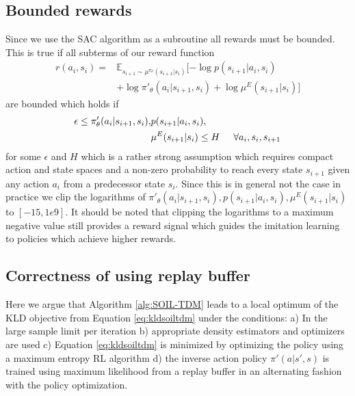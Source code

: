 \documentclass{article}
\begin{document}
\subsection{Bounded rewards}\label{appendix:assumptions}
Since we use the SAC algorithm as a subroutine all rewards must be bounded.
This is true if all subterms of our reward function
\begin{equation}
\begin{aligned}
r(a_i, s_i) = & \mathbb{E}_{s_{i+1} \sim \mu^{\pi_{\theta}}(s_{i+1}|s_i)} [-\log p(s_{i+1}|a_i,s_i) \\& + \log \pi'_{\theta}(a_{i}|s_{i+1},s_i) + \log  \mu^{E}(s_{i+1}|s_i)]
\end{aligned}
\end{equation}
are bounded which holds if 
\begin{equation}
\begin{aligned}\epsilon \leq \pi'_{\theta}(a_{i}|s_{i+1},s_i), & p(s_{i+1}|a_i,s_i), \\& \mu^{E}(s_{i+1}|s_i) \leq H \hspace{0.5cm} \forall a_i,s_i,s_{i+1}
\end{aligned}
\end{equation}
for some $\epsilon$ and $H$ which is a rather strong assumption which requires compact action and state spaces and a non-zero probability to reach every state $s_{i+1}$ given any action $a_i$ from a predecessor state $s_i$.
Since this is in general not the case in practice we clip the logarithms of $\pi'_{\theta}(a_{i}|s_{i+1},s_i), p(s_{i+1}|a_i,s_i), \mu^{E}(s_{i+1}|s_i)$ to $[-15,1e9]$. It should be noted that clipping the logarithms to a maximum negative value still provides a reward signal which guides the imitation learning to policies which achieve higher rewards.

\subsection{Correctness of using replay buffer}\label{appendix:replaybuffer}
Here  we  argue that Algorithm \ref{alg:SOIL-TDM} leads to a local optimum of the KLD objective from Equation \ref{eq:kldsoiltdm} under the conditions: a) In the large sample limit per iteration b) appropriate density estimators and optimizers are used c) Equation \ref{eq:kldsoiltdm} is minimized by optimizing the policy using a maximum entropy RL algorithm d) the inverse action policy $\pi'(a|s',s)$ is trained using maximum likelihood from a replay buffer in an alternating fashion with the policy optimization. 
\end{document}
